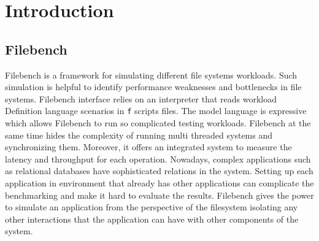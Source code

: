 \chapter{Introduction}\label{chap:intro}

\section{Filebench}
\noindent Filebench is a framework for simulating different file systems workloads. Such simulation is
helpful to identify performance weaknesses and bottlenecks in file systems. 
Filebench interface relies on an interpreter that reads workload Definition language scenarios in \verb+f+ scripts files.
The model language is expressive which allows Filebench to run so complicated
testing workloads. Filebench at the same time hides the complexity of running multi threaded systems and synchronizing them. Moreover, it offers
an integrated system to measure the latency and throughput for each operation\cite{web:fb-main}.
\newline\newline
\noindent Nowadays, complex applications such as relational databases have sophisticated relations in the system. Setting up each 
application in environment that already has other applications can complicate the benchmarking 
and make it hard to evaluate the results. Filebench gives the power to simulate an application from the
perspective of the filesystem isolating any other interactions that the application can have with other
components of the system.


